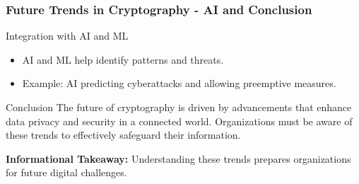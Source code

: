 \documentclass{beamer}
\begin{document}
\begin{frame}[fragile]
    \frametitle{Future Trends in Cryptography - AI and Conclusion}
    \begin{block}{Integration with AI and ML}
    \begin{itemize}
        \item AI and ML help identify patterns and threats.
        \item Example: AI predicting cyberattacks and allowing preemptive measures.
    \end{itemize}
    \end{block}
    
    \begin{block}{Conclusion}
    The future of cryptography is driven by advancements that enhance data privacy and security in a connected world. Organizations must be aware of these trends to effectively safeguard their information.
    \end{block}
    
    \textbf{Informational Takeaway:} Understanding these trends prepares organizations for future digital challenges.
\end{frame}
\end{document}

